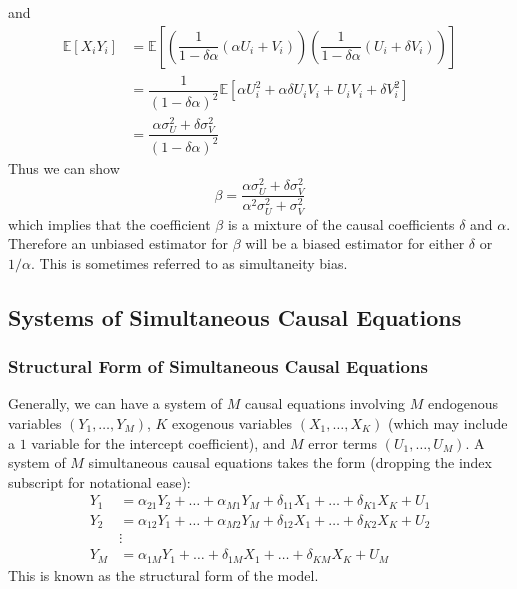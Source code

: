 \documentclass[11pt]{report} %
\begin{document}
and
\begin{align}
\mathbb{E}\left[X_{i}Y_{i}\right] &= \mathbb{E}\left[\left(\dfrac{1}{1 - \delta\alpha}\left(\alpha U_{i} + V_{i}\right)\right)\left(\dfrac{1}{1 - \delta\alpha}\left(U_{i} + \delta V_{i}\right)\right)\right] \\
&= \dfrac{1}{\left(1 - \delta\alpha\right)^{2}}\mathbb{E}\left[\alpha U_{i}^{2} + \alpha\delta U_{i}V_{i} + U_{i}V_{i} + \delta V_{i}^{2}\right] \\
&= \dfrac{\alpha\sigma_{U}^{2} + \delta\sigma_{V}^{2}}{\left(1 - \delta\alpha\right)^{2}}
\end{align}
Thus we can show
\begin{equation}
\beta = \dfrac{\alpha\sigma_{U}^{2} + \delta\sigma_{V}^{2}}{\alpha^{2}\sigma_{U}^{2} + \sigma_{V}^{2}}
\end{equation}
which implies that the coefficient $\beta$ is a mixture of the causal coefficients $\delta$ and $\alpha$. Therefore an unbiased estimator for $\beta$ will be a biased estimator for either $\delta$ or $1/\alpha$. This is sometimes referred to as simultaneity bias.

\subsection{Systems of Simultaneous Causal Equations \cite{Green2012}}

\subsubsection{Structural Form of Simultaneous Causal Equations}

Generally, we can have a system of $M$ causal equations involving $M$ endogenous variables $\left(Y_{1}, \dots, Y_{M}\right)$, $K$ exogenous variables $\left(X_{1}, \dots, X_{K}\right)$ (which may include a $1$ variable for the intercept coefficient), and $M$ error terms $\left(U_{1}, \dots, U_{M}\right)$.  A system of $M$ simultaneous causal equations takes the form (dropping the index subscript for notational ease):
\begin{align}
Y_{1} &= \alpha_{21}Y_{2} + \dots + \alpha_{M1}Y_{M} + \delta_{11}X_{1} + \dots + \delta_{K1}X_{K} + U_{1} \\
Y_{2} &= \alpha_{12}Y_{1} + \dots + \alpha_{M2}Y_{M} + \delta_{12}X_{1} + \dots + \delta_{K2}X_{K} + U_{2} \\
&\vdots \\
Y_{M} &= \alpha_{1M}Y_{1} + \dots  + \delta_{1M}X_{1} + \dots + \delta_{KM}X_{K} + U_{M}
\end{align}
This is known as the structural form of the model. 
\end{document}
